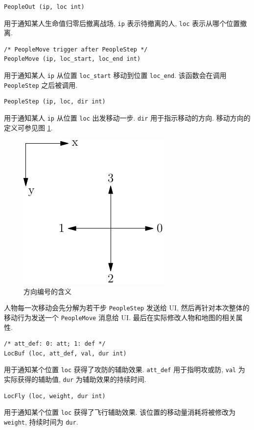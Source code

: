 \documentclass[UTF8, zihao=-4]{ctexart} %
\newcommand{\lcode}{\lstinline} % 段内插入代码
\begin{document}
\begin{lstlisting}
PeopleOut (ip, loc int)
\end{lstlisting}
用于通知某人生命值归零后撤离战场, \lcode{ip} 表示待撤离的人, 
\lcode{loc} 表示从哪个位置撤离.

\begin{lstlisting}
/* PeopleMove trigger after PeopleStep */
PeopleMove (ip, loc_start, loc_end int)
\end{lstlisting}
用于通知某人 \lcode{ip} 从位置 \lcode{loc_start} 移动到位置 \lcode{loc_end}. 该函数会在调用 \lcode{PeopleStep} 之后被调用.

\begin{lstlisting}
PeopleStep (ip, loc, dir int)
\end{lstlisting}
用于通知某人 \lcode{ip} 从位置 \lcode{loc} 出发移动一步. \lcode{dir} 用于指示移动的方向. 移动方向的定义可参见图 \ref{f_dir}.
\begin{figure}
      \centering
      \includegraphics[scale=1]{dir.pdf}
      \caption{\label{f_dir}方向编号的含义}
\end{figure}

人物每一次移动会先分解为若干步 \lcode{PeopleStep} 发送给 UI, 然后再针对本次整体的移动行为发送一个 \lcode{PeopleMove} 消息给 UI.
最后在实际修改人物和地图的相关属性.

\begin{lstlisting}
/* att_def: 0: att; 1: def */
LocBuf (loc, att_def, val, dur int)
\end{lstlisting}
用于通知某个位置 \lcode{loc} 获得了攻防的辅助效果. \lcode{att_def} 用于指明攻或防, 
\lcode{val} 为实际获得的辅助值, \lcode{dur} 为辅助效果的持续时间.

\begin{lstlisting}
LocFly (loc, weight, dur int)
\end{lstlisting}
用于通知某个位置 \lcode{loc} 获得了飞行辅助效果. 该位置的移动量消耗将被修改为 \lcode{weight}, 持续时间为 \lcode{dur}.
\end{document}
